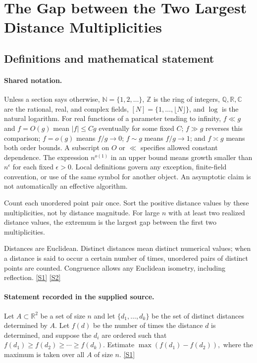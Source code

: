 \documentclass[11pt,a4paper]{article}
\newcommand{\N}{\mathbb{N}}
\newcommand{\Z}{\mathbb{Z}}
\newcommand{\Q}{\mathbb{Q}}
\newcommand{\R}{\mathbb{R}}
\newcommand{\C}{\mathbb{C}}
\newcommand{\sref}[2]{\hyperlink{source:#1:#2}{[S#2]}}
\begin{document}
\section{The Gap between the Two Largest Distance Multiplicities}\label{statement}


\subsection{Definitions and mathematical statement}

\paragraph{Shared notation.}Unless a section says otherwise, $\N=\{1,2,\ldots\}$,
$\Z$ is the ring of integers, $\Q,\R,\C$ are the rational, real, and complex
fields, $[N]=\{1,\ldots,\lfloor N\rfloor\}$, and $\log$ is the natural
logarithm. For real functions of a parameter tending to infinity,
$f\ll g$ and $f=O(g)$ mean $|f|\leq Cg$ eventually for some fixed $C$;
$f\gg g$ reverses this comparison; $f=o(g)$ means $f/g\to0$;
$f\sim g$ means $f/g\to1$; and $f\asymp g$ means both order bounds.
A subscript on $O$ or $\ll$ specifies allowed constant dependence.
The expression $n^{o(1)}$ in an upper bound means growth smaller than
$n^\epsilon$ for each fixed $\epsilon>0$. Local definitions govern any
exception, finite-field convention, or use of the same symbol for another
object. An asymptotic claim is not automatically an effective algorithm.



Count each unordered point pair once. Sort the positive distance values by these multiplicities, not by distance magnitude. For large $n$ with at least two realized distance values, the extremum is the largest gap between the first two multiplicities.

Distances are Euclidean. Distinct distances mean distinct numerical values; when a distance is said to occur a certain number of times, unordered pairs of distinct points are counted. Congruence allows any Euclidean isometry, including reflection. \sref{statement}{1} \sref{statement}{2}

\paragraph{Statement recorded in the supplied source.}
Let $A\subset \mathbb{R}^2$ be a set of size $n$ and let $\{d_1,\ldots,d_k\}$ be the set of distinct distances determined by $A$. Let $f(d)$ be the number of times the distance $d$ is determined, and suppose the $d_i$ are ordered such that $ f(d_1)\geq f(d_2)\geq \cdots \geq f(d_k). $ Estimate $ \max (f(d_1)-f(d_2)), $ where the maximum is taken over all $A$ of size $n$. \sref{statement}{1}
\end{document}
